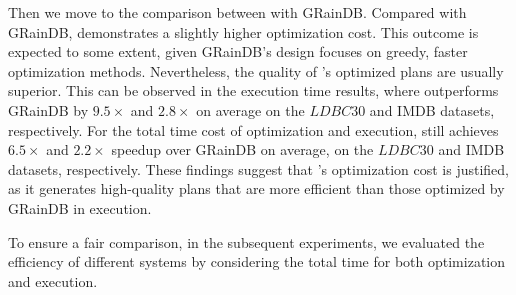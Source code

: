 {Then we move to the comparison between \name with GRainDB. Compared with GRainDB, \name demonstrates a slightly higher optimization cost. This outcome is expected to some extent, given GRainDB's design focuses on greedy, faster optimization methods.
Nevertheless, the quality of \name's optimized plans are usually superior. This can be observed in the execution time results, where \name outperforms GRainDB by $9.5\times$ and $2.8\times$ on average on the $LDBC30$ and IMDB datasets, respectively.
For the total time cost of optimization and execution, \name still achieves $6.5\times$ and $2.2\times$ speedup over GRainDB on average, on the $LDBC30$ and IMDB datasets, respectively.
These findings suggest that \name's optimization cost is justified, as it generates high-quality plans that are more efficient than those optimized by GRainDB in execution.

To ensure a fair comparison, in the subsequent experiments, we evaluated the efficiency of different systems by considering the total time for both optimization and execution.
}

